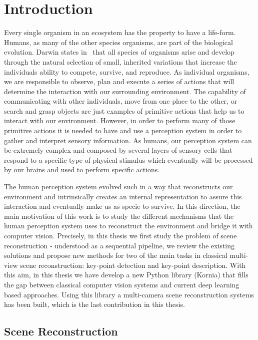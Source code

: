 \graphicspath{{./main/2_introduction/figures/}}

\chapter{Introduction}
\label{chap:intro}

Every single organism in an ecosystem has the property to have a life-form. Humans, as many of the other species organisms, are part of the biological evolution. Darwin states in~\citep{darwin1859} that all species of organisms arise and develop through the natural selection of small, inherited variations that increase the individuals ability to compete, survive, and reproduce. As individual organisms, we are responsible to observe, plan and execute a series of actions that will determine the interaction with our surrounding environment. The capability of communicating with other individuals, move from one place to the other, or search and grasp objects are just examples of primitive actions that help us to interact with our environment. However, in order to perform many of those primitive actions it is needed to have and use a perception system in order to gather and interpret sensory information. As humans, our perception system can be extremely complex and composed by several layers of sensory cells that respond to a specific type of physical stimulus which eventually will be processed by our brains and used to perform specific actions.

The human perception system evolved such in a way that reconstructs our environment and intrinsically creates an internal representation to assure this interaction and eventually make us as specie to survive. In this direction, the main motivation of this work is to study the different mechanisms that the human perception system uses to reconstruct the environment and bridge it with computer vision. Precisely, in this thesis we first study the problem of scene reconstruction - understood as a sequential pipeline, we review the existing solutions and propose new methods for two of the main tasks in classical multi-view scene reconstruction: key-point detection and key-point description. With this aim, in this thesis we have develop a new Python library (Kornia) that fills the gap between classical computer vision systems and current deep learning based approaches. Using this library a multi-camera scene reconstruction systems has been built, which is the last contribution in this thesis.

\section{Scene Reconstruction}

